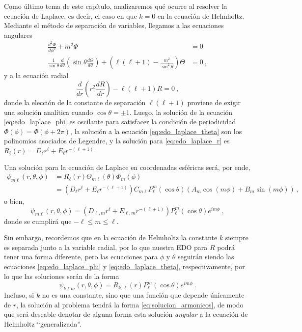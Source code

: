 Como último tema de este capítulo, analizaremos qué ocurre al resolver la ecuación de Laplace, es decir, el caso en que $k=0$ en la ecuación de Helmholtz. Mediante el método de separación de variables, llegamos a las ecuaciones angulares
\begin{align}
    \frac{d^2 \Phi}{d\phi^2} + m^2 \Phi & = 0 \label{eq:edo_laplace_phi} \\
    \frac{1}{\sin \theta} \frac{d}{d\theta}\left( \sin\theta \frac{d\Theta}{d\theta} \right) + \left( \ell(\ell+1) - \frac{m^2}{\sin^2\theta} \right)\Theta & = 0 \label{eq:edo_laplace_theta} \ ,
\end{align}
y a la ecuación radial
\begin{equation}
    \frac{d}{dr}\left( r^2 \frac{dR}{dr} \right) - \ell(\ell+1) R = 0 \ , \label{eq:edo_laplace_r}
\end{equation}
donde la elección de la constante de separación $\ell(\ell+1)$ proviene de exigir una solución analítica cuando $\cos\theta = \pm 1$. Luego, la solución de la ecuación \eqref{eq:edo_laplace_phi} es oscilante para satisfacer la condición de periodicidad $\Phi(\phi) = \Phi(\phi + 2\pi)$, la solución a la ecuación \eqref{eq:edo_laplace_theta} son los polinomios asociados de Legendre, y la solución para \eqref{eq:edo_laplace_r} es $R_\ell(r) = D_\ell r^\ell + E_\ell r^{-(\ell+1)}$.

Una solución para la ecuación de Laplace en coordenadas esféricas será, por ende,
\begin{align}
    \psi_{m\ell}(r,\theta,\phi) & = R_\ell(r) \Theta_{m\ell}(\theta) \Phi_m (\phi) \nonumber \\
    & = (D_\ell r^\ell + E_\ell r^{-(\ell+1)}) C_{m\ell} P_\ell^m(\cos\theta)(A_m \cos(m\phi) + B_m \sin(m\phi)) \ ,
\end{align}
o bien,
\begin{equation}
    \psi_{m\ell}(r,\theta,\phi) = (D_{\ell, m} r^\ell + E_{\ell, m} r^{-(\ell+1)}) P_\ell^m(\cos\theta) e^{im\phi} \ ,
\end{equation}
donde se cumplirá que $- \ell \leq m \leq \ell$.

Sin embargo, recordemos que en la ecuación de Helmholtz la constante $k$ siempre es separada junto a la variable radial, por lo que nuestra EDO para $R$ podrá tener una forma diferente, pero las ecuaciones para $\phi$ y $\theta$ seguirán siendo las ecuaciones \eqref{eq:edo_laplace_phi} y \eqref{eq:edo_laplace_theta}, respectivamente, por lo que las soluciones serán de la forma
\begin{equation}\label{eq:solucion_armonicos} 
    \psi_{k\ell m}(r, \theta, \phi) = R_{k, \ell}(r) P_\ell^m(\cos\theta) e^{im\phi} \ .
\end{equation}
Incluso, si $k$ no es una constante, sino que una función que depende únicamente de $r$, la solución al problema tendrá la forma \eqref{eq:solucion_armonicos}, de modo que será deseable denotar de alguna forma esta solución \emph{angular} a la ecuación de Helmholtz ``generalizada''.

